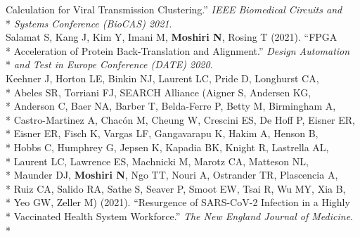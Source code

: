 \documentclass[margin,line]{res}
\begin{document}
\begin{resume}
\hspace*{9mm} Calculation for Viral Transmission Clustering.'' \textit{IEEE Biomedical Circuits and}\\*\vspace{2mm}
\hspace*{8mm} \textit{Systems Conference (BioCAS) 2021}.\\
\hspace*{4mm} Salamat S, Kang J, Kim Y, Imani M, \textbf{Moshiri N}, Rosing T (2021). ``FPGA\\*
\hspace*{9mm} Acceleration of Protein Back-Translation and Alignment.'' \textit{Design Automation}\\*\vspace{2mm}
\hspace*{8mm} \textit{and Test in Europe Conference (DATE) 2020}.\\
\hspace*{4mm} Keehner J, Horton LE, Binkin NJ, Laurent LC, Pride D, Longhurst CA,\\*
\hspace*{9mm} Abeles SR, Torriani FJ, SEARCH Alliance (Aigner S, Andersen KG,\\*
\hspace*{9mm} Anderson C, Baer NA, Barber T, Belda-Ferre P, Betty M, Birmingham A,\\*
\hspace*{9mm} Castro-Martinez A, Chac\'on M, Cheung W, Crescini ES, De Hoff P, Eisner ER,\\*
\hspace*{9mm} Eisner ER, Fisch K, Vargas LF, Gangavarapu K, Hakim A, Henson B,\\*
\hspace*{9mm} Hobbs C, Humphrey G, Jepsen K, Kapadia BK, Knight R, Lastrella AL,\\*
\hspace*{9mm} Laurent LC, Lawrence ES, Machnicki M, Marotz CA, Matteson NL,\\*
\hspace*{9mm} Maunder DJ, \textbf{Moshiri N}, Ngo TT, Nouri A, Ostrander TR, Plascencia A,\\*
\hspace*{9mm} Ruiz CA, Salido RA, Sathe S, Seaver P, Smoot EW, Tsai R, Wu MY, Xia B,\\*
\hspace*{9mm} Yeo GW, Zeller M) (2021). ``Resurgence of SARS-CoV-2 Infection in a Highly\\*
\hspace*{9mm} Vaccinated Health System Workforce.'' \textit{The New England Journal of Medicine}.\\*\vspace{2mm}

\end{resume}
\end{document}
